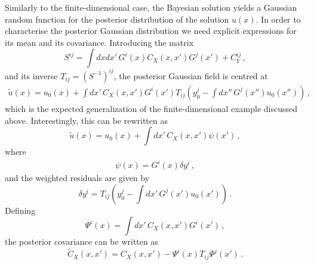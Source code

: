 Similarly to the finite-dimensional case, the Bayesian solution yields a Gaussian 
random function for the posterior distribution of the solution $u(x)$. In order to 
characterise the posterior Gaussian distribution we need explicit expressions for its mean
and its covariance. Introducing the matrix
\begin{equation}
  \label{eq:Smatrix}
  S^{ij} =
  \int dx dx'\, G^i(x) C_{X}(x,x') G^j(x') + C_{Y}^{ij}\, ,
\end{equation}
and its inverse $T_{ij}=\left(S^{-1}\right)^{ij}$, the posterior Gaussian field is centred at
\begin{align}
  \label{eq:PostMeanFunc}
  \tilde{u}(x) = u_0(x) + 
  \int dx'\, C_{X}(x,x') G^i(x') T_{ij} \left(
    y_0^j - \int dx''\, G^j(x'') u_0(x'') 
  \right)\, ,
\end{align}
which is the expected generalization of the finite-dimensional example discussed
above. Interestingly, this can be rewritten as
\begin{equation}
  \label{eq:TowardsBackus}
  \tilde{u}(x) = u_0(x) + 
  \int dx'\, C_{X}(x,x') \psi(x')\, ,
\end{equation}
where 
\begin{eqnarray}
  \label{eq:PsiDef}
  \psi(x) = G^i(x) \delta y^i\, ,
\end{eqnarray}
and the weighted residuals are given by
\begin{equation}
  \label{eq:DeltaYDef}
  \delta y^i = T_{ij} \left(
  y_0^j - \int dx'\, G^j(x') u_0(x')
  \right)\, .
\end{equation}
Defining 
\begin{equation}
  \label{eq:CapitalPsi}
  \Psi^i(x) = \int dx'\, C_{X}(x,x') G^i(x')\, ,
\end{equation}
the posterior covariance can be written as
\begin{equation}
  \label{eq:PostCovFunc}
  \tilde{C}_{X}(x,x') = 
  C_{X}(x,x') - \Psi^i(x) T_{ij} \Psi^j(x')\, .
\end{equation}

